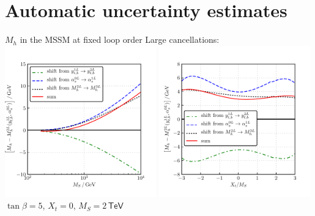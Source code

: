 \documentclass[hyperref={pdfpagelabels=false},ngerman]{beamer}
\newcommand{\eh}[1]{\,\mathsf{#1}}
\newcommand{\MS}{\ensuremath{M_S}}
\begin{document}

\section{Automatic uncertainty estimates}

\begin{frame}{$M_h$ in the MSSM at fixed loop order}
  Large cancellations:\\
  \includegraphics[width=0.49\textwidth]{plots/Mh3L/scan_Mh_MS_TB-5_Xt-0_contributions}\hfill
  \includegraphics[width=0.49\textwidth]{plots/Mh3L/scan_Mh_Xt_TB-5_MS-2000_contributions}\\
  $\tan\beta=5$, $X_t=0$, $\MS = 2\eh{TeV}$
\end{frame}
\end{document}
